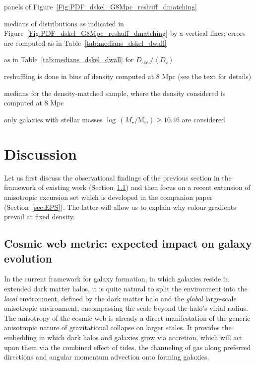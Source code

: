 \documentclass[useAMS,usenatbib]{mnras}
\newcommand{\Mstardot}{M\ensuremath{_{\star}} / \mathrm{M}\ensuremath{_{\odot}}}
\begin{document}
\begin{table*}
\begin{threeparttable}
\begin{tablenotes}
     \item\label{tnote:panels} panels of Figure~\ref{Fig:PDF_dskel_G8Mpc_reshuff_dmatching}
     \item\label{tnote:median} medians of distributions as indicated in Figure~\ref{Fig:PDF_dskel_G8Mpc_reshuff_dmatching} by a vertical lines; errors are computed as in Table~\ref{tab:medians_dskel_dwall}  
     \item\label{tnote:before} as in Table~\ref{tab:medians_dskel_dwall} for $D_{\mathrm{skel}}/\left<D_\mathrm{z}\right>$                                     
     \item\label{tnote:after} reshuffling is done in bins of density computed at 8 Mpc (see the text for details)
     \item\label{tnote:dmatching} medians for the density-matched sample, where the density considered is computed at 8 Mpc 
     \item\label{tnote:SF_q_mass} only galaxies with stellar masses  $\log \, (\Mstardot) \geq 10.46$ are considered
    \end{tablenotes}
\end{threeparttable}
\end{table*}


\section{Discussion}
\label{sec:discussion}


Let us first discuss the observational  findings of the previous section in the  framework of existing work  (Section~\ref{sec:insight})
and then focus on a recent extension of anisotropic excursion set  which is developed in the companion paper  (Section~\ref{sec:EPS}).
The latter will allow us to explain why colour gradients prevail at fixed density.

\subsection{Cosmic web metric: expected impact on galaxy evolution}
\label{sec:insight}
%
% 
In the  current framework for galaxy formation, in which galaxies  reside in extended dark matter halos, it is quite natural to split the environment into the \emph{local} environment, defined by the dark matter halo and the \emph{global} large-scale anisotropic  environment, encompassing the scale  beyond the halo's virial radius. 
The anisotropy of  the cosmic web is already a direct manifestation of the generic anisotropic nature of gravitational collapse on larger scales.
It provides the embedding in which dark halos and galaxies grow via accretion, which will act upon them via the combined effect of tides, the channeling of gas  along preferred directions and angular momentum advection onto forming galaxies.  
\end{document}
